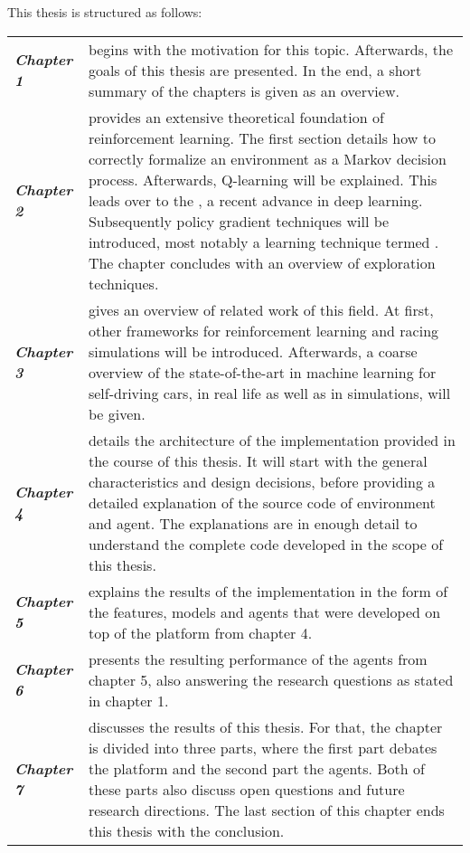 This thesis is structured as follows:


\renewcommand{\arraystretch}{1.3}
\begin{flushleft}
\begin{tabular}{>{\em}p{2.2cm} p{\textwidth-3.2cm}} 
	\textbf{Chapter 1} & begins with the motivation for this topic. Afterwards, the goals of this thesis are presented. In the end, a short summary of the chapters is given as an overview.\\
	\textbf{Chapter 2} & provides an extensive theoretical foundation of reinforcement learning. The first section details how to correctly formalize an environment as a Markov decision process. Afterwards, Q-learning will be explained. This leads over to the \keyword{Deep Q Network}, a recent advance in deep learning. Subsequently policy gradient techniques will be introduced, most notably a learning technique termed \keyword{Deep DPG}. The chapter concludes with an overview of exploration techniques.\\
	\textbf{Chapter 3} & gives an overview of related work of this field. At first, other frameworks for reinforcement learning and racing simulations will be introduced. Afterwards, a coarse overview of the state-of-the-art in machine learning for self-driving cars, in real life as well as in simulations, will be given.\\
	\textbf{Chapter 4} & details the architecture of the implementation provided in the course of this thesis. It will start with the general characteristics and design decisions, before providing a detailed explanation of the source code of environment and agent. The explanations are in enough detail to understand the complete code developed in the scope of this thesis.\\
	\textbf{Chapter 5} & explains the results of the implementation in the form of the features, models and agents that were developed on top of the platform from chapter 4.\\
	\textbf{Chapter 6} & presents the resulting performance of the agents from chapter 5, also answering the research questions as stated in chapter 1.\\
	\textbf{Chapter 7} & discusses the results of this thesis. For that, the chapter is divided into three parts, where the first part debates the platform and the second part the agents. Both of these parts also discuss open questions and future research directions. The last section of this chapter ends this thesis with the conclusion.\\
\end{tabular}
\end{flushleft}